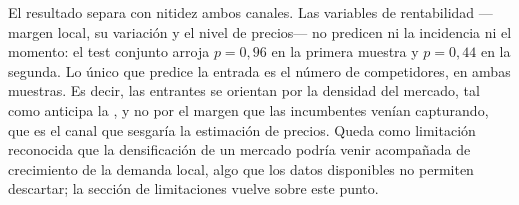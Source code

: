 El resultado separa con nitidez ambos canales. Las variables de rentabilidad
—margen local, su variación y el nivel de precios— no predicen ni la incidencia
ni el momento: el test conjunto arroja $p = 0{,}96$ en la primera muestra y
$p = 0{,}44$ en la segunda. Lo único que predice la entrada es el número de
competidores, en ambas muestras. Es decir, las entrantes se orientan por la
densidad del mercado, tal como anticipa la , y no por el margen
que las incumbentes venían capturando, que es el canal que sesgaría la
estimación de precios. Queda como limitación reconocida que la densificación de
un mercado podría venir acompañada de crecimiento de la demanda local, algo que
los datos disponibles no permiten descartar; la sección de limitaciones vuelve
sobre este punto.
